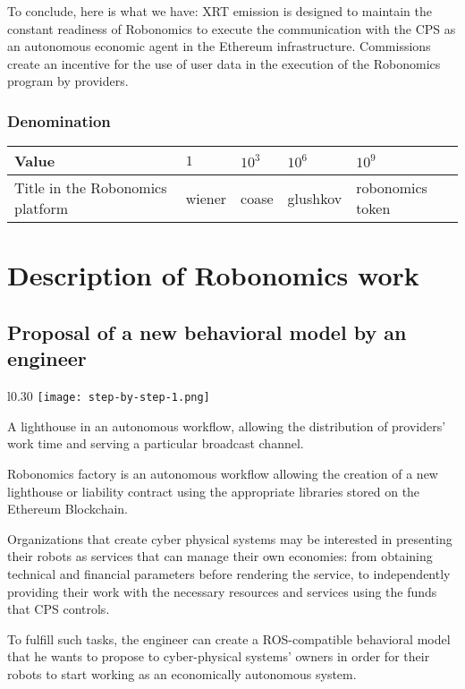 \documentclass{article}
\begin{document}
To conclude, here is what we have: XRT emission is designed to maintain the constant readiness of Robonomics to execute the communication with the CPS as an autonomous economic agent in the Ethereum infrastructure. Commissions create an incentive for the use of user data in the execution of the Robonomics program by providers.

\subsubsection{Denomination }
\begin{tabular}{ l |l |l |l |l}
 Value &  $1$ & $10^3$ & $10^6$  & $10^9$ \\ 
 \hline
 Title in the Robonomics platform &  wiener & coase  & glushkov & robonomics token\\ 
\end{tabular}

\section{Description of Robonomics work}
\subsection{Proposal of a new behavioral model by an engineer}

\begin{wrapfigure}{l}{0.30\textwidth} %
    \centering
    \texttt{[image: step-by-step-1.png]}
\end{wrapfigure}

A lighthouse in an autonomous workflow, allowing the distribution of providers' work time and serving a particular broadcast channel.

Robonomics factory is an autonomous workflow allowing the creation of a new lighthouse or liability contract using the appropriate libraries stored on the Ethereum Blockchain.

Organizations that create cyber physical systems may be interested in presenting their robots as services that can manage their own economies: from obtaining technical and financial parameters before rendering the service, to independently providing their work with the necessary resources and services using the funds that CPS controls.

To fulfill such tasks, the engineer can create a ROS-compatible behavioral model that he wants to propose to cyber-physical systems' owners in order for their robots to start working as an economically autonomous system.
\end{document}
